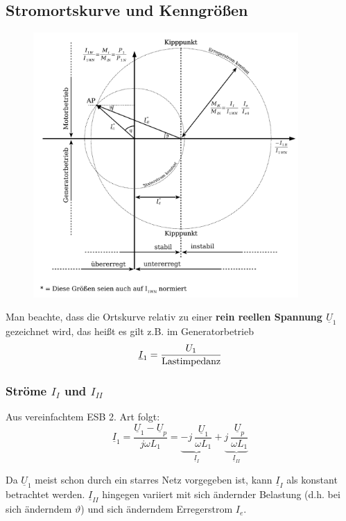 \documentclass[11pt]{article}
\begin{document}
\subsection*{Stromortskurve und Kenngrößen}
\begin{figure}[H]
	\centering
	\includegraphics[width=0.9\textwidth]{img/synchronmaschine_ortskurve.pdf}
\end{figure}

Man beachte, dass die Ortskurve relativ zu einer \textbf{rein reellen Spannung $\underline U_1$} gezeichnet wird, das heißt es gilt z.B. im Generatorbetrieb
\[
	\underline I_1 = \frac{U_1}{\textnormal{Lastimpedanz}}
\]

\subsubsection*{Ströme $I_I$ und $I_{II}$}
Aus vereinfachtem ESB 2. Art folgt:
\[
	\underline I_1 = \frac{\underline U_1 - \underline U_p}{j\omega L_1} = \underbrace{-j ~ \frac{\underline U_1}{\omega L_1}}_{\underline I_I} + \underbrace{j ~ \frac{\underline U_p}{\omega L_1}}_{\underline I_{II}}
\]

Da $\underline U_1$ meist schon durch ein starres Netz vorgegeben ist, kann $\underline I_I$ als konstant betrachtet werden. $\underline I_{II}$ hingegen variiert mit sich ändernder Belastung (d.h. bei sich änderndem $\vartheta$) und sich änderndem Erregerstrom $I_e$.
\end{document}
